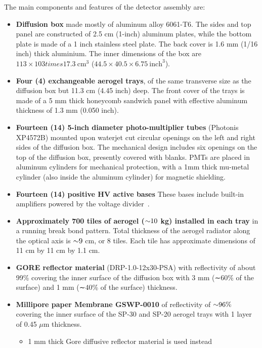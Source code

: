 {The main components and features of the detector assembly are:
\begin{itemize}
  \item \textbf{Diffusion box} made mostly of aluminum alloy 6061-T6. The
    sides and top panel are constructed of 2.5 cm (1-inch) aluminum
    plates, while the bottom plate is made of a 1 inch stainless steel
    plate. The back cover is 1.6 mm (1/16 inch) thick aluminium. The
    inner dimensions of the box are $113\times 103
times 17.3~\textrm{cm}^3$ ($44.5\times 40.5\times 6.75~\textrm{inch}^3$).
  \item \textbf{Four (4) exchangeable aerogel trays}, of the same transverse
    size as the diffusion box but 11.3 cm (4.45 inch) deep. The front
    cover of the trays is made of a 5 mm thick honeycomb sandwich
    panel with effective aluminum thickness of 1.3 mm (0.050 inch).
  \item \textbf{Fourteen (14) 5-inch diameter photo-multiplier tubes}
    (Photonis XP4572B) mounted upon waterjet cut circular openings on
    the left and right sides of the diffusion box. The mechanical
    design includes six openings on the top of the diffusion box,
    presently covered with blanks. PMTs are placed in aluminum
    cylinders for mechanical protection, with a 1mm thick mu-metal
    cylinder (also inside the aluminum cylinder) for magnetic
    shielding.
  \item \textbf{Fourteen (14) positive HV active bases}   These
  bases include built-in amplifiers powered by the voltage
  divider~\cite{Popov2001,Popov2003316}.
  \item \textbf{Approximately 700 tiles of aerogel ($\mathord{\sim} 10$ kg) installed in each
    tray} in a running break bond pattern. Total thickness of the
    aerogel radiator along the optical axis is $\mathord{\sim} 9$ cm, or 8 tiles. Each
    tile has approximate dimensions of 11 cm by 11 cm by 1.1 cm.
  \item \textbf{GORE reflector material} (DRP-1.0-12x30-PSA) with reflectivity
    of about 99\% covering the inner surface of the diffusion box with
    3 mm (∼60\% of the surface) and 1 mm (∼40\% of the surface)
    thickness.
  \item \textbf{Millipore paper Membrane GSWP-0010} of reflectivity of $\mathord{\sim} 96\%$
    covering the inner surface of the SP-30 and SP-20 aerogel trays
    with 1 layer of 0.45 $\mu$m thickness.
  \begin{itemize}
    \item 1 mm thick Gore diffusive reflector material is used instead

\end{itemize}
\end{itemize}}
